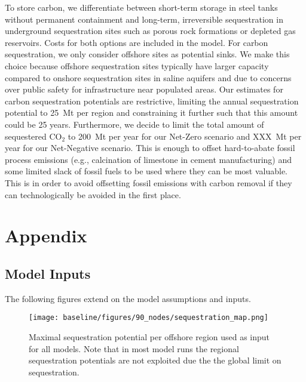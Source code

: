 \documentclass[twocolumn]{article}
\newcommand{\COtwo}{CO$_2$}
\begin{document}

To store carbon, we differentiate between short-term storage in steel tanks without permanent containment and long-term, irreversible sequestration in underground sequestration sites such as porous rock formations or depleted gas reservoirs.
Costs for both options are included in the model.
For carbon sequestration, we only consider offshore sites as potential sinks.
We make this choice because offshore sequestration sites typically have larger capacity compared to onshore sequestration sites in saline aquifers and due to concerns over public safety for infrastructure near populated areas.
Our estimates for carbon sequestration potentials are restrictive, limiting the annual sequestration potential to 25~Mt per region and constraining it further such that this amount could be  25 years.
Furthermore, we decide to limit the total amount of sequestered \COtwo{} to 200~Mt per year for our Net-Zero scenario and XXX~Mt per year for our Net-Negative scenario.
This is enough to offset hard-to-abate fossil process emissions (e.g., calcination of limestone in cement manufacturing) and some limited slack of fossil fuels to be used where they can be most valuable.
This is in order to avoid offsetting fossil emissions with carbon removal if they can technologically be avoided in the first place.


\printbibliography

\newpage
\appendix
\setcounter{section}{0}
\renewcommand{\thesection}{\Alph{section}}
\renewcommand{\thefigure}{\Alph{section}.\arabic{figure}} %

\onecolumn %

\section*{Appendix}

\subsection{Model Inputs}

The following figures extend on the model assumptions and inputs.

\begin{figure}[h!]
    \centering
    \texttt{[image: baseline/figures/90\_nodes/sequestration\_map.png]}
    \caption{Maximal sequestration potential per offshore region used as input for all models. Note that in most model runs the regional sequestration potentials are not exploited due the the global limit on sequestration.}
\end{figure}
\end{document}
